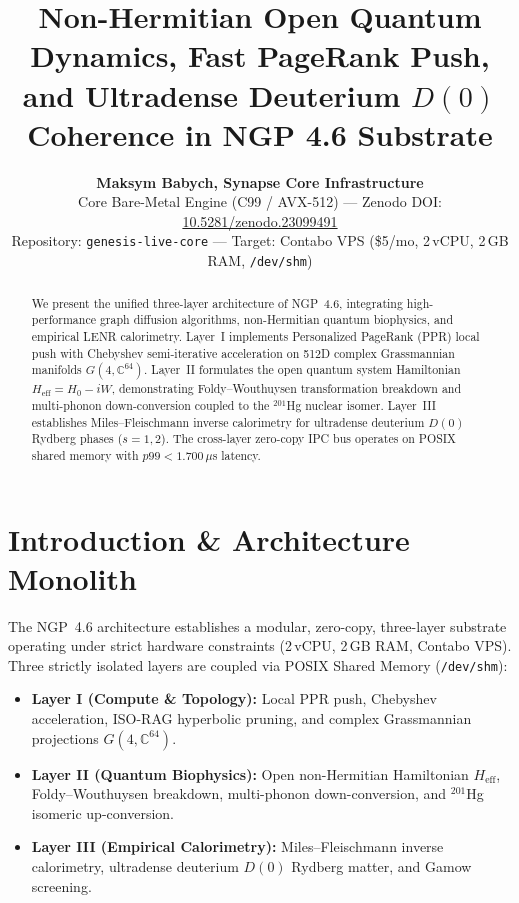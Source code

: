 \documentclass[10pt,twocolumn]{article}
\title{\textbf{Non-Hermitian Open Quantum Dynamics, Fast PageRank Push,\\
and Ultradense Deuterium $D(0)$ Coherence in NGP 4.6 Substrate}}
\author{\textbf{Maksym Babych, Synapse Core Infrastructure}\\
\small Core Bare-Metal Engine (C99 / AVX-512) ---
Zenodo DOI: \href{https://doi.org/10.5281/zenodo.23099491}{10.5281/zenodo.23099491}\\
\small Repository: \texttt{genesis-live-core} ---
Target: Contabo VPS (\$5/mo, 2\,vCPU, 2\,GB RAM, \texttt{/dev/shm})}
\date{}
\begin{document}
\maketitle

\begin{abstract}
We present the unified three-layer architecture of NGP~4.6, integrating
high-performance graph diffusion algorithms, non-Hermitian quantum biophysics,
and empirical LENR calorimetry. Layer~I implements Personalized PageRank (PPR)
local push with Chebyshev semi-iterative acceleration on 512D complex
Grassmannian manifolds $G(4,\mathbb{C}^{64})$. Layer~II formulates the open
quantum system Hamiltonian $H_{\mathrm{eff}}=H_0-iW$, demonstrating
Foldy--Wouthuysen transformation breakdown and multi-phonon down-conversion
coupled to the $^{201}$Hg nuclear isomer. Layer~III establishes
Miles--Fleischmann inverse calorimetry for ultradense deuterium $D(0)$ Rydberg
phases ($s=1,2$). The cross-layer zero-copy IPC bus operates on POSIX shared
memory with $p99<1.700\,\mu$s latency.
\end{abstract}

\section{Introduction \& Architecture Monolith}
The NGP~4.6 architecture establishes a modular, zero-copy, three-layer substrate
operating under strict hardware constraints (2\,vCPU, 2\,GB RAM, Contabo VPS).
Three strictly isolated layers are coupled via POSIX Shared Memory
(\texttt{/dev/shm}):
\begin{itemize}
  \item \textbf{Layer I (Compute \& Topology):} Local PPR push, Chebyshev
        acceleration, ISO-RAG hyperbolic pruning, and complex Grassmannian
        projections $G(4,\mathbb{C}^{64})$.
  \item \textbf{Layer II (Quantum Biophysics):} Open non-Hermitian Hamiltonian
        $H_{\mathrm{eff}}$, Foldy--Wouthuysen breakdown, multi-phonon
        down-conversion, and $^{201}$Hg isomeric up-conversion.
  \item \textbf{Layer III (Empirical Calorimetry):} Miles--Fleischmann inverse
        calorimetry, ultradense deuterium $D(0)$ Rydberg matter, and Gamow
        screening.
\end{itemize}
\end{document}
